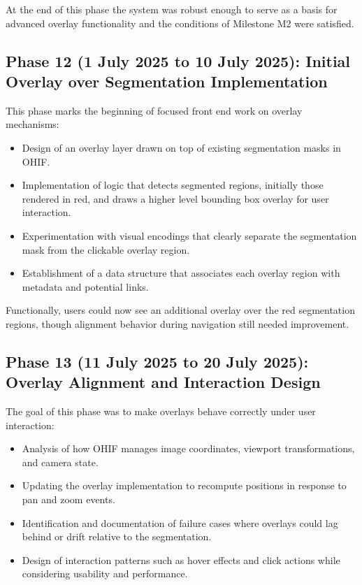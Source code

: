 \documentclass[11pt,a4paper]{article}
\begin{document}
At the end of this phase the system was robust enough to serve as a basis for advanced overlay functionality and the conditions of Milestone M2 were satisfied.

\subsection*{Phase 12 (1 July 2025 to 10 July 2025): Initial Overlay over Segmentation Implementation}

This phase marks the beginning of focused front end work on overlay mechanisms:

\begin{itemize}
    \item Design of an overlay layer drawn on top of existing segmentation masks in OHIF.
    \item Implementation of logic that detects segmented regions, initially those rendered in red, and draws a higher level bounding box overlay for user interaction.
    \item Experimentation with visual encodings that clearly separate the segmentation mask from the clickable overlay region.
    \item Establishment of a data structure that associates each overlay region with metadata and potential links.
\end{itemize}

Functionally, users could now see an additional overlay over the red segmentation regions, though alignment behavior during navigation still needed improvement.

\subsection*{Phase 13 (11 July 2025 to 20 July 2025): Overlay Alignment and Interaction Design}

The goal of this phase was to make overlays behave correctly under user interaction:

\begin{itemize}
    \item Analysis of how OHIF manages image coordinates, viewport transformations, and camera state.
    \item Updating the overlay implementation to recompute positions in response to pan and zoom events.
    \item Identification and documentation of failure cases where overlays could lag behind or drift relative to the segmentation.
    \item Design of interaction patterns such as hover effects and click actions while considering usability and performance.
\end{itemize}
\end{document}
